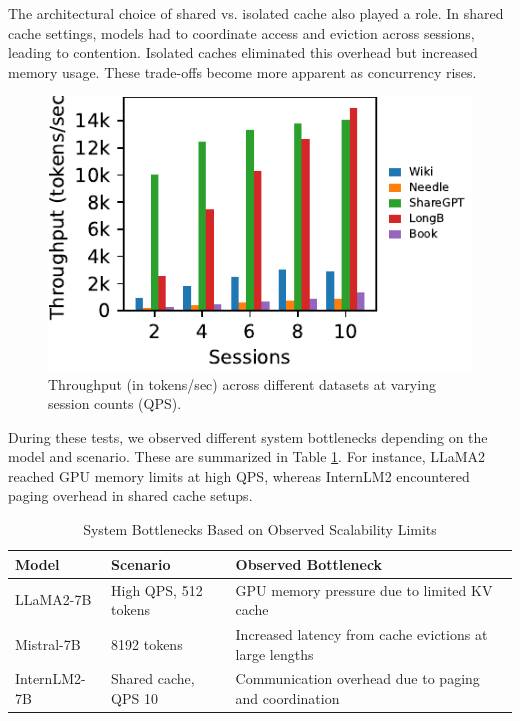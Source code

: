 \documentclass[sigconf,nonacm]{acmart}
\begin{document}
The architectural choice of shared vs. isolated cache also played a role. In shared cache settings, models had to coordinate access and eviction across sessions, leading to contention. Isolated caches eliminated this overhead but increased memory usage. These trade-offs become more apparent as concurrency rises.
\begin{figure}[h]
    \centering
    \includegraphics[scale=0.8]{figure8b.pdf}
    \vspace{-1.0em}  
    \caption{Throughput (in tokens/sec) across different datasets at varying session counts (QPS).}
    \label{fig8b}
\end{figure}
\par During these tests, we observed different system bottlenecks depending on the model and scenario. These are summarized in Table \ref{tab:bottleneck}. For instance, LLaMA2 reached GPU memory limits at high QPS, whereas InternLM2 encountered paging overhead in shared cache setups.
\begin{table}[h]
\renewcommand{\arraystretch}{0.95}  %
\small  %
\centering
\caption{System Bottlenecks Based on Observed Scalability Limits}
\vspace{-0.5em}
\begin{tabularx}{\linewidth}{l p{2.5cm} X}
\hline
\textbf{Model} & \textbf{Scenario} & \textbf{Observed Bottleneck} \\
\hline
LLaMA2-7B & High QPS, 512 tokens & GPU memory pressure due to limited KV cache \\
\hline
Mistral-7B & 8192 tokens & Increased latency from cache evictions at large lengths \\
\hline
InternLM2-7B & Shared cache, QPS 10 & Communication overhead due to paging and coordination \\
\hline
\end{tabularx}

\label{tab:bottleneck}
\end{table}
\end{document}
